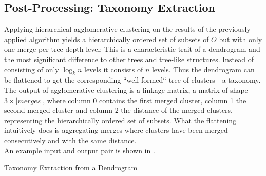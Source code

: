\subsection{Post-Processing: Taxonomy Extraction}\label{\positionnumber}
Applying hierarchical agglomerative clustering on the results of the previously applied algorithm yields a hierarchically ordered set of subsets of $O$ but with only one merge per tree depth level: This is a characteristic trait of a dendrogram and the most significant difference to other trees and tree-like structures. Instead of consisting of only $\log_k n$ levels it consists of $n$ levels. Thus the dendrogram can be flattened to get the corresponding ``well-formed`` tree of clusters - a taxonomy. \\
The output of agglomerative clustering is a linkage matrix, a matrix of shape $3 \times |merges|$, where column 0 contains the first merged cluster, column 1 the second merged cluster and column 2 the distance of the merged clusters, representing the hierarchically ordered set of subsets.
What the flattening intuitively does is aggregating merges where clusters have been merged consecutively and with the same distance. \\
An example input and output pair is shown in .
\begin{algorithm}[htp]
\caption{Taxonomy Extraction from a Dendrogram}\label{taxo}
\end{algorithm}

